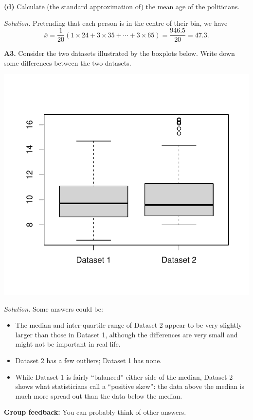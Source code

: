 \documentclass[
  a4paper,
]{book}
\providecommand{\tightlist}{%
  \setlength{\itemsep}{0pt}\setlength{\parskip}{0pt}}
\theoremstyle{definition}
\theoremstyle{definition}
\theoremstyle{definition}
\theoremstyle{definition}
\theoremstyle{remark}
\begin{document}
\textbf{(d)} Calculate (the standard approximation of) the mean age of the politicians.

\begin{myanswers}
\emph{Solution.} Pretending that each person is in the centre of their bin, we have
\[ \bar x = \frac{1}{20} (1\times24 + 3\times 35 + \cdots + 3 \times 65) = \frac{946.5}{20} = 47.3 . \]

\end{myanswers}

\textbf{A3.} Consider the two datasets illustrated by the boxplots below. Write down some differences between the two datasets.

\includegraphics{math1710_files/figure-latex/unnamed-chunk-26-1.pdf}

\begin{myanswers}
\emph{Solution.} Some answers could be:

\begin{itemize}
\tightlist
\item
  The median and inter-quartile range of Dataset 2 appear to be very slightly larger than those in Dataset 1, although the differences are very small and might not be important in real life.
\item
  Dataset 2 has a few outliers; Dataset 1 has none.
\item
  While Dataset 1 is fairly ``balanced'' either side of the median, Dataset 2 shows what statisticians call a ``positive skew'': the data above the median is much more spread out than the data below the median.
\end{itemize}

\textbf{Group feedback:}
You can probably think of other answers.

\end{myanswers}
\end{document}
